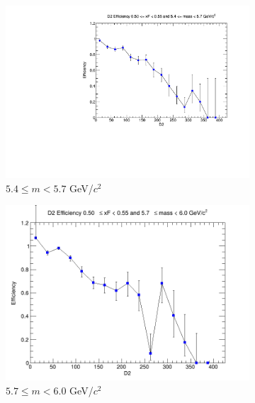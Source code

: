 \begin{figure}[p]
\begin{subfigure}[b]{0.32\textwidth}
        \includegraphics[width=\textwidth]{./kTrackerEfficiencyPlots/D2_Efficiency_xF10_mass4.pdf}
        \caption{$5.4 \leq m < 5.7$ GeV/$c^2$}
        \label{fig:xF10_mass4}
    \end{subfigure}
    \hfill
    \begin{subfigure}[b]{0.32\textwidth}
        \centering
        \includegraphics[width=\textwidth]{./kTrackerEfficiencyPlots/D2_Efficiency_xF10_mass5.png}
        \caption{$5.7 \leq m < 6.0$ GeV/$c^2$}
        \label{fig:xF10_mass5}
    \end{subfigure}
    \vspace{0.5cm}
    \begin{subfigure}[b]{0.32\textwidth}
        \centering

\end{subfigure}
\end{figure}
